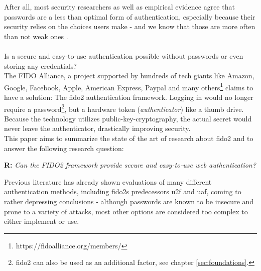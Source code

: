 After all, most security researchers as well as empirical evidence agree that passwords are a less than optimal form of authentication, especially because their security relies on the choices users make - and we know that those are more often than not weak ones \cite{hunt2018c,whitty2015}.\\
\\
Is a secure and easy-to-use authentication possible without passwords or even storing any credentials?\\
The FIDO Alliance, a project supported by hundreds of tech giants like Amazon, Google, Facebook, Apple, American Express, Paypal and many others\footnote{https://fidoalliance.org/members/} claims to have a solution: The \ac{fido2} authentication framework. Logging in would no longer require a password\footnote{\ac{fido2} can also be used as an additional factor, see chapter \ref{sec:foundations}.}, but a hardware token (\emph{authenticator}) like a thumb drive. Because the technology utilizes public-key-cryptography, the actual secret would never leave the authenticator, drastically improving security.\\
This paper aims to summarize the state of the art of research about \ac{fido2} and to answer the following research question:


\begin{displayquote}
    \textbf{R:} \emph{Can the FIDO2 framework provide secure and easy-to-use web authentication?}
\end{displayquote}

Previous literature has already shown evaluations of many different authentication methods, including \acp{fido2} predecessors \ac{u2f} and \ac{uaf}, coming to rather depressing conclusions \cite{bonneau2012,hunt2018a,lang2017,das2018} - although passwords are known to be insecure and prone to a variety of attacks, most other options are considered too complex to either implement or use.